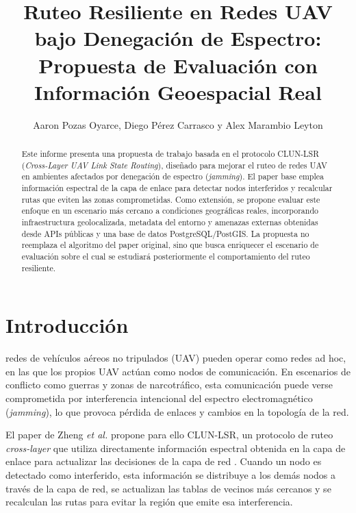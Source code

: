 \documentclass[journal,10pt]{IEEEtran}
\begin{document}
\title{Ruteo Resiliente en Redes UAV bajo Denegación de Espectro: Propuesta de Evaluación con Información Geoespacial Real}

\author{Aaron Pozas Oyarce, Diego Pérez Carrasco y Alex Marambio Leyton}

\maketitle

\begin{abstract}
Este informe presenta una propuesta de trabajo basada en el protocolo CLUN-LSR
(\textit{Cross-Layer UAV Link State Routing}), diseñado para mejorar el ruteo de redes UAV
en ambientes afectados por denegación de espectro (\textit{jamming}). El paper base emplea
información espectral de la capa de enlace para detectar nodos interferidos y recalcular rutas
que eviten las zonas comprometidas. Como extensión, se propone evaluar este enfoque en un
escenario más cercano a condiciones geográficas reales, incorporando infraestructura
geolocalizada, metadata del entorno y amenazas externas obtenidas desde APIs públicas y una base de datos PostgreSQL/PostGIS. La propuesta no reemplaza el algoritmo del paper original,
sino que busca enriquecer el escenario de evaluación sobre el cual se estudiará posteriormente
el comportamiento del ruteo resiliente.
\end{abstract}

\IEEEpeerreviewmaketitle

\section{Introducción}

 redes de vehículos aéreos no tripulados (UAV) pueden operar como redes
ad hoc, en las que los propios UAV actúan como nodos de comunicación. En escenarios de conflicto como guerras y zonas de narcotráfico,
esta comunicación puede verse comprometida por interferencia intencional del espectro
electromagnético (\textit{jamming}), lo que provoca pérdida de enlaces y cambios en la topología de la red.

El paper de Zheng \textit{et al.} propone para ello CLUN-LSR, un protocolo de ruteo \textit{cross-layer}
que utiliza directamente información espectral obtenida en la capa de enlace para actualizar las
decisiones de la capa de red \cite{clunlsr}. Cuando un nodo es detectado como interferido, esta
información se distribuye a los demás nodos a través de la capa de red, se actualizan las tablas de vecinos más cercanos y se recalculan
las rutas para evitar la región que emite esa interferencia.
\end{document}
